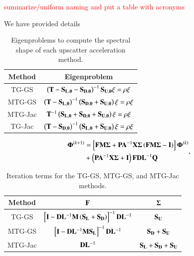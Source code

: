 \documentclass[preprint,10pt]{elsarticle}
\newcommand{\tcr}[1]{\textcolor{red}{#1}}
\begin{document}
\tcr{summarize/uniform naming and put a table with acronyms}

We have provided details

\begin{table}
\centering
\caption{Eigenproblems to compute the spectral shape of each upscatter acceleration method.}
\def\arraystretch{1.5}
\begin{tabular}{|c|c|} \hline
Method &  Eigenproblem \\ \hline \hline
TG-GS & $\left(  {\bf T} - {\bf S_{L,0}} - {\bf S_{D,0}} \right)^{-1} {\bf S_{U,0}} \xi = \rho \xi$ \\ \hline
MTG-GS & $\left(  {\bf T} - {\bf S_{L,0}}  \right)^{-1} \left( {\bf S_{D,0}}+ {\bf S_{U,0}} \right)\xi = \rho \xi $ \\ \hline
MTG-Jac &${\bf T}^{-1} \left( {\bf S_{L,0}}+{\bf S_{D,0}} +  {\bf S_{U,0}} \right)\xi = \rho \xi$   \\ \hline
TG-Jac & $\left(  {\bf T} - {\bf S_{D,0}} \right)^{-1} \left( {\bf S_{L,0}} +  {\bf S_{U,0}} \right)\xi = \rho \xi$ \\ \hline
\end{tabular}
\label{tab::DSA_MG_Summary_eprobs}
\end{table}

\begin{equation}
\label{eq::DSA_MG_Summary_form}
\begin{aligned}
{\bf \Phi}^{(k+1)} &= \left[ {\bf F} {\bf M} {\bf \Sigma} + {\bf P} {\bf A}^{-1}  {\bf X} {\bf \Sigma} \left(  {\bf F} {\bf M} {\bf \Sigma} - {\bf I} \right)  \right]   {\bf \Phi}^{(k)} \\
&+ \left(  {\bf P} {\bf A}^{-1}  {\bf X} {\bf \Sigma}  + {\bf I} \right) {\bf F} {\bf D}{\bf L}^{-1}  {\bf Q}
\end{aligned} ,
\end{equation}

\begin{table}
\centering
\caption{Iteration terms for the TG-GS, MTG-GS, and MTG-Jac methods.}
\def\arraystretch{1.5}
\begin{tabular}{|c||c|c|} \hline
Method & ${\bf F}$ & ${\bf \Sigma}$ \\ \hline \hline
TG-GS & $\left[ {\bf I} - {\bf D}{\bf L}^{-1} {\bf M} \left(  {\bf S_L} + {\bf S_D} \right) \right]^{-1} {\bf D}{\bf L}^{-1}$ & ${\bf S_{U}}$ \\ \hline
MTG-GS & $\left[ {\bf I} - {\bf D}{\bf L}^{-1} {\bf M}{\bf S_L}\right]^{-1} {\bf D}{\bf L}^{-1}$ & ${\bf S_{D}} + {\bf S_{U}}$ \\ \hline
MTG-Jac & ${\bf D}{\bf L}^{-1}$ & ${\bf S_{L}} + {\bf S_{D}} + {\bf S_{U}}$ \\ \hline
\end{tabular}
\label{tab::DSA_MG_Summary_diffterms}
\end{table}
\end{document}
